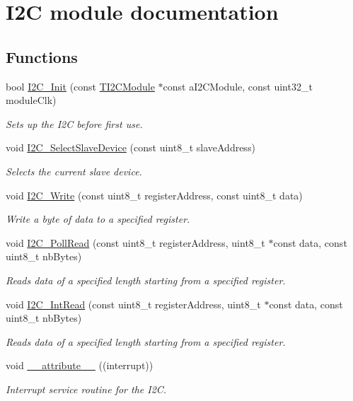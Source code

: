 \hypertarget{group___i2_c__module}{}\section{I2\+C module documentation}
\label{group___i2_c__module}
\subsection*{Functions}
\begin{DoxyCompactItemize}
\item 
bool \hyperlink{group___i2_c__module_ga4fc37bd20c1e62b168e314e8b447a853}{I2\+C\+\_\+\+Init} (const \hyperlink{struct_t_i2_c_module}{T\+I2\+C\+Module} $\ast$const a\+I2\+C\+Module, const uint32\+\_\+t module\+Clk)
\begin{DoxyCompactList}\small\item\em Sets up the I2\+C before first use. \end{DoxyCompactList}\item 
void \hyperlink{group___i2_c__module_ga0d6844ce590bbf5cc557fdf0747ad551}{I2\+C\+\_\+\+Select\+Slave\+Device} (const uint8\+\_\+t slave\+Address)
\begin{DoxyCompactList}\small\item\em Selects the current slave device. \end{DoxyCompactList}\item 
void \hyperlink{group___i2_c__module_gacaac94d86a7213791fb691d57c6f278b}{I2\+C\+\_\+\+Write} (const uint8\+\_\+t register\+Address, const uint8\+\_\+t data)
\begin{DoxyCompactList}\small\item\em Write a byte of data to a specified register. \end{DoxyCompactList}\item 
void \hyperlink{group___i2_c__module_ga3692682bb1cb84e1a3d0c31195451bd9}{I2\+C\+\_\+\+Poll\+Read} (const uint8\+\_\+t register\+Address, uint8\+\_\+t $\ast$const data, const uint8\+\_\+t nb\+Bytes)
\begin{DoxyCompactList}\small\item\em Reads data of a specified length starting from a specified register. \end{DoxyCompactList}\item 
void \hyperlink{group___i2_c__module_ga3685b2f03da2fa00b0cb671a0cce4f3f}{I2\+C\+\_\+\+Int\+Read} (const uint8\+\_\+t register\+Address, uint8\+\_\+t $\ast$const data, const uint8\+\_\+t nb\+Bytes)
\begin{DoxyCompactList}\small\item\em Reads data of a specified length starting from a specified register. \end{DoxyCompactList}\item 
void \hyperlink{group___i2_c__module_ga445500277ba0e363873b34cffc015745}{\+\_\+\+\_\+attribute\+\_\+\+\_\+} ((interrupt))
\begin{DoxyCompactList}\small\item\em Interrupt service routine for the I2\+C. \end{DoxyCompactList}\end{DoxyCompactItemize}


